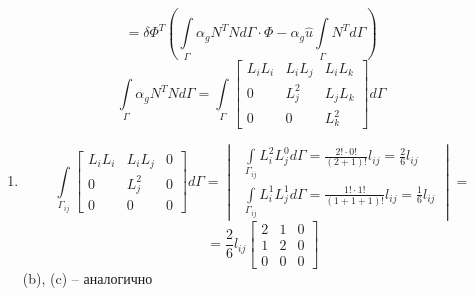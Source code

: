 \documentclass{bmstu}
\begin{document}
\begin{enumerate}
	\[=\delta\Phi^T \left(\int \limits_{\Gamma} \alpha_g N^T N d\Gamma \cdot \Phi - \alpha_g \hat u \int \limits_{\Gamma} N^T d\Gamma \right)\]
	\[\int \limits_{\Gamma} \alpha_g N^T N d\Gamma = \int \limits_{\Gamma} \begin{bmatrix}
	L_iL_i & L_iL_j & L_iL_k\\
	0 & L_j^2 & L_jL_k\\
	0 & 0 & L_k^2
	\end{bmatrix}
	d\Gamma
	\]
	\begin{enumerate}
	\item \[\int \limits_{\Gamma_{ij}} \begin{bmatrix}
	L_iL_i & L_iL_j & 0\\
	0 & L_j^2 & 0\\
	0 & 0 & 0
	\end{bmatrix}
	d\Gamma = 
	\begin{vmatrix} \displaystyle
			\ \int\limits_{\Gamma_{ij}} L_i^2L_j^0 d\Gamma = \frac{2!\cdot 0!}{(2+1)!} l_{ij} = \frac{2}{6}l_{ij}\\
			\ \displaystyle \int\limits_{\Gamma_{ij}} L_i^1L_j^1 d\Gamma = \frac{1! \cdot 1!}{(1+1+1)!} l_{ij} = \frac{1}{6}l_{ij}
			\end{vmatrix}=\]
	\[= \frac{2}{6}l_{ij} 
	\begin{bmatrix}
	2 & 1 & 0\\
	1 & 2 & 0\\
	0 & 0 & 0
	\end{bmatrix}
	\]
	(b), (c) -- аналогично
	\end{enumerate}
	\end{enumerate}
	
	
	
\end{document}
